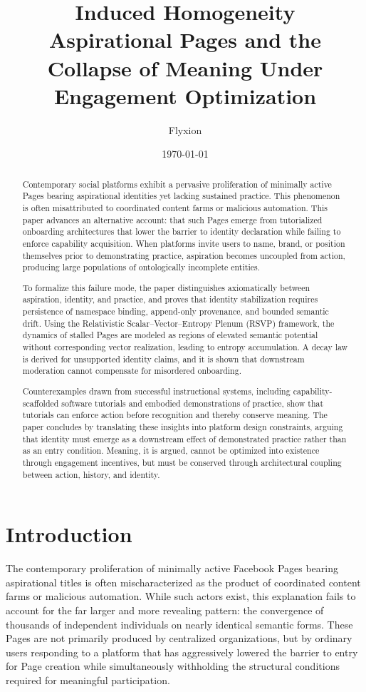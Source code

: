 \documentclass[11pt,oneside]{article}
\title{Induced Homogeneity\\
{\normalsize Aspirational Pages and the Collapse of Meaning Under Engagement Optimization} }
\author{Flyxion}
\date{\today}
\begin{document}
\maketitle

\begin{abstract}
Contemporary social platforms exhibit a pervasive proliferation of minimally active Pages bearing aspirational identities yet lacking sustained practice. This phenomenon is often misattributed to coordinated content farms or malicious automation. This paper advances an alternative account: that such Pages emerge from tutorialized onboarding architectures that lower the barrier to identity declaration while failing to enforce capability acquisition. When platforms invite users to name, brand, or position themselves prior to demonstrating practice, aspiration becomes uncoupled from action, producing large populations of ontologically incomplete entities.

To formalize this failure mode, the paper distinguishes axiomatically between aspiration, identity, and practice, and proves that identity stabilization requires persistence of namespace binding, append-only provenance, and bounded semantic drift. Using the Relativistic Scalar--Vector--Entropy Plenum (RSVP) framework, the dynamics of stalled Pages are modeled as regions of elevated semantic potential without corresponding vector realization, leading to entropy accumulation. A decay law is derived for unsupported identity claims, and it is shown that downstream moderation cannot compensate for misordered onboarding.

Counterexamples drawn from successful instructional systems, including capability-scaffolded software tutorials and embodied demonstrations of practice, show that tutorials can enforce action before recognition and thereby conserve meaning. The paper concludes by translating these insights into platform design constraints, arguing that identity must emerge as a downstream effect of demonstrated practice rather than as an entry condition. Meaning, it is argued, cannot be optimized into existence through engagement incentives, but must be conserved through architectural coupling between action, history, and identity.
\end{abstract}


\section{Introduction}

The contemporary proliferation of minimally active Facebook Pages bearing aspirational titles is often mischaracterized as the product of coordinated content farms or malicious automation. While such actors exist, this explanation fails to account for the far larger and more revealing pattern: the convergence of thousands of independent individuals on nearly identical semantic forms. These Pages are not primarily produced by centralized organizations, but by ordinary users responding to a platform that has aggressively lowered the barrier to entry for Page creation while simultaneously withholding the structural conditions required for meaningful participation.
\end{document}

